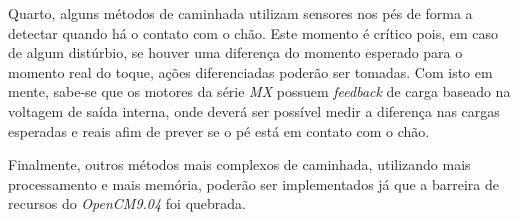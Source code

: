 Quarto, alguns métodos de caminhada utilizam sensores nos pés de forma a detectar quando há o contato com o chão. Este momento é crítico pois, em caso de algum distúrbio, se houver uma diferença do momento esperado para o momento real do toque, ações diferenciadas poderão ser tomadas. Com isto em mente, sabe-se que os motores da série \textit{MX} possuem \textit{feedback} de carga baseado na voltagem de saída interna, onde deverá ser possível medir a diferença nas cargas esperadas e reais afim de prever se o pé está em contato com o chão.

Finalmente, outros métodos mais complexos de caminhada, utilizando mais processamento e mais memória, poderão ser implementados já que a barreira de recursos do \textit{OpenCM9.04} foi quebrada.